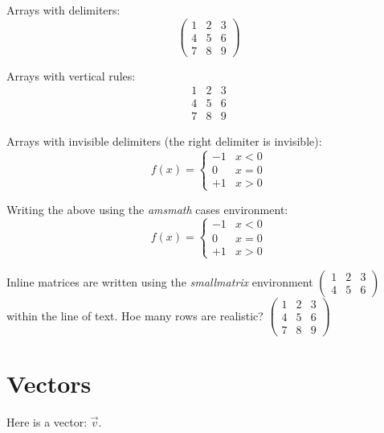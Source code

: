 \documentclass{scrartcl}
\begin{document}
Arrays with delimiters:
\[
\left(
    \begin{array}{rrr}
        1 & 2 & 3\\
        4 & 5 & 6\\
        7 & 8 & 9
    \end{array}
\right)
\]

Arrays with vertical rules:
\[
\begin{array}{rr|r}
    1 & 2 & 3\\
    4 & 5 & 6\\
    7 & 8 & 9
\end{array}
\]

Arrays with invisible delimiters (the right delimiter is invisible):
\[
    f(x) = 
    \left\{
    \begin{array}{rl}
        -1 & x < 0\\
         0 & x = 0\\
        +1 & x > 0
    \end{array}    
    \right.
\]

Writing the above using the \emph{amsmath} cases environment:
\[
    f(x) = 
    \begin{cases}
        -1 & x < 0\\
         0 & x = 0\\
        +1 & x > 0
    \end{cases}
\]

Inline matrices are written using the \emph{smallmatrix} environment
\begin{math}
    \left(
        \begin{smallmatrix}
            1 & 2 & 3\\
            4 & 5 & 6
        \end{smallmatrix}
    \right)
\end{math}
within the line of text. Hoe many rows are realistic?
\begin{math}
    \left(
        \begin{smallmatrix}
            1 & 2 & 3\\
            4 & 5 & 6\\
            7 & 8 & 9
        \end{smallmatrix}
    \right)
\end{math}

\section{Vectors}

Here is a vector: $\vec{v}$.
\end{document}
